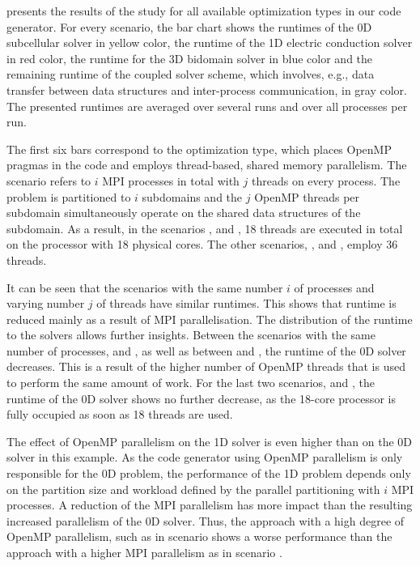  presents the results of the study for all available optimization types in our code generator. For every scenario, the bar chart shows the runtimes of the 0D subcellular solver in yellow color, the runtime of the 1D electric conduction solver in red color, the runtime for the 3D bidomain solver in blue color and the remaining runtime of the coupled solver scheme, which involves, e.g., data transfer between data structures and inter-process communication, in gray color.
The presented runtimes are averaged over several runs and over all processes per run.

The first six bars correspond to the  optimization type, which places OpenMP pragmas in the code and employs thread-based, shared memory parallelism. The scenario  refers to $i$ MPI processes in total with $j$ threads on every process. The problem is partitioned to $i$ subdomains and the $j$ OpenMP threads per subdomain simultaneously operate on the shared data structures of the subdomain.
As a result, in the scenarios ,  and , 18 threads are executed in total on the processor with 18 physical cores. The other scenarios, ,  and , employ 36 threads.

It can be seen that the scenarios with the same number $i$ of processes and varying number $j$ of threads have similar runtimes. This shows that runtime is reduced mainly as a result of MPI parallelisation. The distribution of the runtime to the solvers allows further insights. Between the scenarios with the same number of processes,  and , as well as between  and , the runtime of the 0D solver decreases. This is a result of the higher number of OpenMP threads that is used to perform the same amount of work. For the last two scenarios,  and , the runtime of the 0D solver shows no further decrease, as the 18-core processor is fully occupied as soon as 18 threads are used.

The effect of OpenMP parallelism on the 1D solver is even higher than on the 0D solver in this example. As the code generator using OpenMP parallelism is only responsible for the 0D problem, the performance of the 1D problem depends only on the partition size and workload defined by the parallel partitioning with $i$ MPI processes. A reduction of the MPI parallelism has more impact than the resulting increased parallelism of the 0D solver. Thus, the approach with a high degree of OpenMP parallelism, such as in scenario  shows a worse performance than the approach with a higher MPI parallelism as in scenario .

